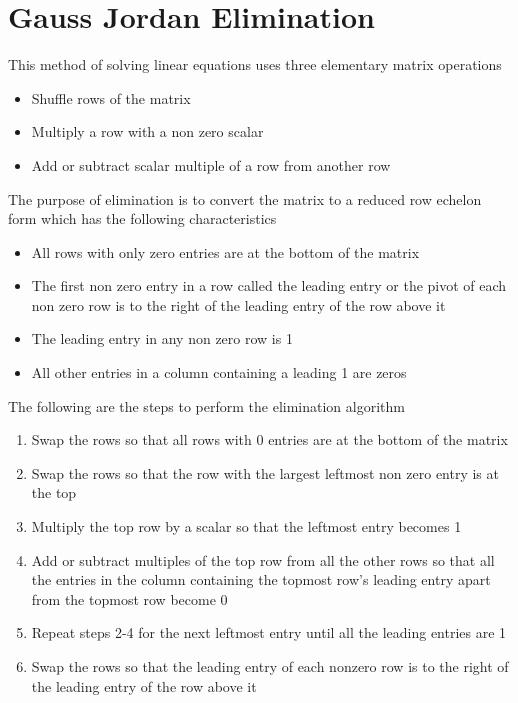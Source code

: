 \documentclass[../../linear_algebra.tex]{subfiles}
\begin{document}
\section{Gauss Jordan Elimination}
This method of solving linear equations uses three elementary matrix operations
\begin{itemize}
    \item Shuffle rows of the matrix
    \item Multiply a row with a non zero scalar
    \item Add or subtract scalar multiple of a row from another row
\end{itemize}

The purpose of elimination is to convert the matrix to a reduced row echelon form which has the following characteristics
\begin{itemize}
    \item All rows with only zero entries are at the bottom of the matrix
    \item The first non zero entry in a row called the leading entry or the pivot of each non zero row is to the right of the leading entry of the row above it
    \item The leading entry in any non zero row is 1
    \item All other entries in a column containing a leading 1 are zeros
\end{itemize}
The following are the steps to perform the elimination algorithm
\begin{enumerate}
    \item Swap the rows so that all rows with 0 entries are at the bottom of the matrix
    \item Swap the rows so that the row with the largest leftmost non zero entry is at the top
    \item Multiply the top row by a scalar so that the leftmost entry becomes 1
    \item Add or subtract multiples of the top row from all the other rows so that all the entries in the column containing the topmost row's leading entry apart from the topmost row become 0
    \item Repeat steps 2-4 for the next leftmost entry until all the leading entries are 1
    \item Swap the rows so that the leading entry of each nonzero row is to the right of the leading entry of the row above it
\end{enumerate}
\end{document}
